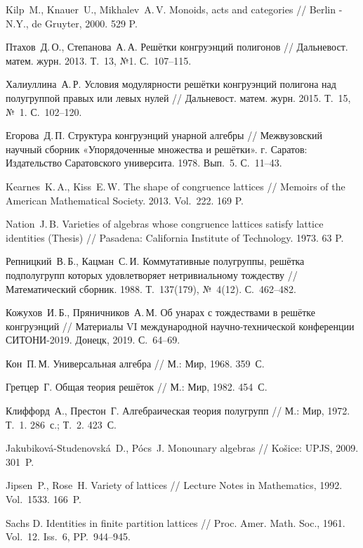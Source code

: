 \documentclass[11pt,twoside,final
]{article}
\begin{document}
\begin{thebibliography}{99}

	Kilp~M., Knauer~U., Mikhalev~A.\,V. Monoids, acts and categories // Berlin - N.Y., de Gruyter, 2000. 529 P.

	Птахов~Д.\,О., Степанова~А.\,А. Решётки конгруэнций полигонов // Дальневост. матем. журн. 2013. Т.~13, №1. С.~107--115.

	Халиуллина~А.\,Р. Условия модулярности решётки конгруэнций полигона над полугруппой правых или левых нулей // Дальневост. матем. журн. 2015. Т.~15, №~1. С.~102--120.

	Егорова~Д.\,П. Структура конгруэнций унарной алгебры // Межвузовский научный сборник «Упорядоченные множества и решётки». г. Саратов: Издательство Саратовского университа. 1978. Вып.~5. С.~11--43.

	Kearnes~K.\,A., Kiss~E.\,W. The shape of congruence lattices // Memoirs of the American Mathematical Society. 2013. Vol.~222. 169 P.

	Nation~J.\,B. Varieties of algebras whose congruence lattices satisfy lattice identities (Thesis) // Pasadena: California Institute of Technology. 1973. 63 P.

	Репницкий~В.\,Б., Кацман~С.\,И. Коммутативные полугруппы, решётка подполугрупп которых удовлетворяет нетривиальному тождеству // Математический сборник. 1988. Т.~137(179), №~4(12). С.~462--482.

	Кожухов~И.\,Б., Пряничников~А.\,М. Об унарах с тождествами в решётке конгруэнций // Материалы VI международной научно-технической конференции СИТОНИ-2019. Донецк, 2019. С.~64--69.

	Кон~П.\,М. Универсальная алгебра // М.: Мир, 1968. 359~С.

	Гретцер~Г. Общая теория решёток // М.: Мир, 1982. 454~С.

	Клиффорд~А., Престон~Г. Алгебраическая теория полугрупп // М.: Мир, 1972. Т.~1. 286~с.; Т.~2. 423~С.

	Jakubiková-Studenovská~D., Pócs~J. Monounary algebras // Košice: UPJS, 2009. 301~P.

	Jipsen~P., Rose~H. Variety of lattices // Lecture Notes in Mathematics, 1992. Vol.~1533. 166~P.

	Sachs D. Identities in finite partition lattices // Proc. Amer. Math. Soc., 1961. Vol.~12. Iss.~6, PP.~944--945.

\end{thebibliography}
\end{document}
